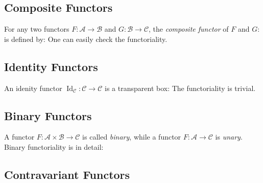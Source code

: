 \subsection{Composite Functors}

For any two functors $F : \mathcal{A} \to \mathcal{B}$ and $G : \mathcal{B} \to \mathcal{C}$, %
the \textit{composite functor} of $F$ and $G$:
is defined by:
One can easily check the functoriality.


\subsection{Identity Functors}

An idenity functor $\operatorname{Id}_{\mathcal{C}} : \mathcal{C} \to \mathcal{C}$ is a transparent box:
The functoriality is trivial.


\subsection{Binary Functors}

A functor $F : \mathcal{A} \times \mathcal{B} \to \mathcal{C}$ is called \textit{binary}, while
a functor $F : \mathcal{A} \to \mathcal{C}$ is \textit{unary}.
Binary functoriality is in detail:

\subsection{Contravariant Functors}

